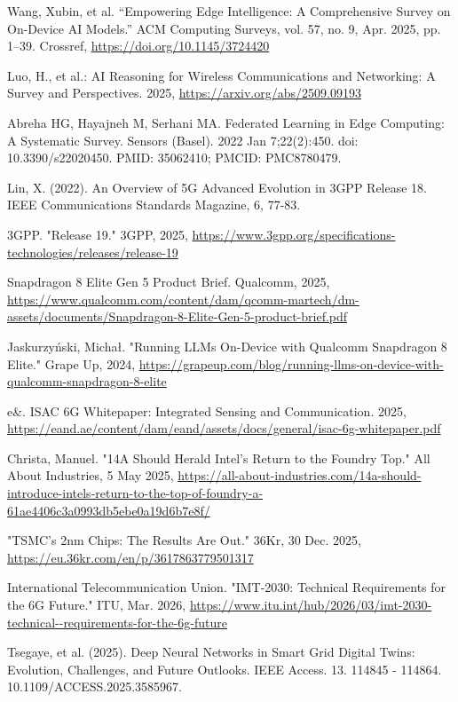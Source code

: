 \documentclass[runningheads]{llncs}
\begin{document}
\begin{thebibliography}{}
     Wang, Xubin, et al. “Empowering Edge Intelligence: A Comprehensive Survey on On-Device AI Models.” ACM Computing Surveys, vol. 57, no. 9, Apr. 2025, pp. 1–39. Crossref, \url{https://doi.org/10.1145/3724420}
    
     Luo, H., et al.: AI Reasoning for Wireless Communications and Networking: A Survey and Perspectives. 2025, \url{https://arxiv.org/abs/2509.09193}

     Abreha HG, Hayajneh M, Serhani MA. Federated Learning in Edge Computing: A Systematic Survey. Sensors (Basel). 2022 Jan 7;22(2):450. doi: 10.3390/s22020450. PMID: 35062410; PMCID: PMC8780479.
    
     Lin, X. (2022). An Overview of 5G Advanced Evolution in 3GPP Release 18. IEEE Communications Standards Magazine, 6, 77-83.
    
     3GPP. "Release 19." 3GPP, 2025, \url{https://www.3gpp.org/specifications-technologies/releases/release-19}
    
     Snapdragon 8 Elite Gen 5 Product Brief. Qualcomm, 2025, \url{https://www.qualcomm.com/content/dam/qcomm-martech/dm-assets/documents/Snapdragon-8-Elite-Gen-5-product-brief.pdf}
    
     Jaskurzyński, Michał. "Running LLMs On-Device with Qualcomm Snapdragon 8 Elite." Grape Up, 2024, \url{https://grapeup.com/blog/running-llms-on-device-with-qualcomm-snapdragon-8-elite}
    
     e\&. ISAC 6G Whitepaper: Integrated Sensing and Communication. 2025, \url{https://eand.ae/content/dam/eand/assets/docs/general/isac-6g-whitepaper.pdf}
    
     Christa, Manuel. "14A Should Herald Intel's Return to the Foundry Top." All About Industries, 5 May 2025, \href{https://all-about-industries.com/14a-should-introduce-intels-return-to-the-top-of-foundry-a-61ae4406c3a0993db5ebe0a19d6b7e8f/}{https://all-about-industries.com/14a-should-introduce-intels-return-to-the-top-of-foundry-a-61ae4406c3a0993db5ebe0a19d6b7e8f/}

     "TSMC's 2nm Chips: The Results Are Out." 36Kr, 30 Dec. 2025, \url{https://eu.36kr.com/en/p/3617863779501317}
    
     International Telecommunication Union. "IMT-2030: Technical Requirements for the 6G Future." ITU, Mar. 2026, \url{https://www.itu.int/hub/2026/03/imt-2030-technical--requirements-for-the-6g-future}

     Tsegaye, et al. (2025). Deep Neural Networks in Smart Grid Digital Twins: Evolution, Challenges, and Future Outlooks. IEEE Access. 13. 114845 - 114864. 10.1109/ACCESS.2025.3585967.
\end{thebibliography}
\end{document}
